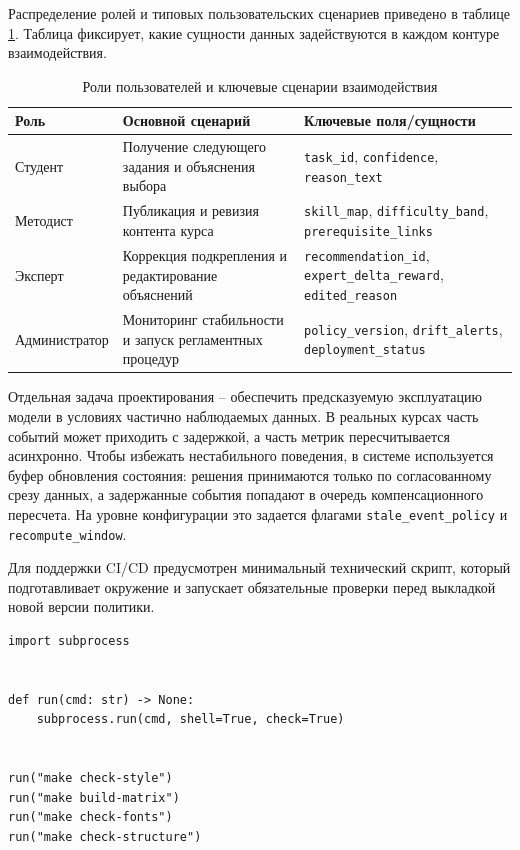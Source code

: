 Распределение ролей и типовых пользовательских сценариев приведено в таблице
\ref{tab:user-roles-scenarios}. Таблица фиксирует, какие сущности данных
задействуются в каждом контуре взаимодействия.

\begin{table}[htbp]
  \caption{Роли пользователей и ключевые сценарии взаимодействия}
  \label{tab:user-roles-scenarios}
  \centering

  \begin{tabular}{|p{}|p{}|p{}|}
    \hline
    Роль & Основной сценарий & Ключевые поля/сущности \\
    \hline
    Студент & Получение следующего задания и объяснения выбора & \texttt{task\_id}, \texttt{confidence}, \texttt{reason\_text} \\
    \hline
    Методист & Публикация и ревизия контента курса & \texttt{skill\_map}, \texttt{difficulty\_band}, \texttt{prerequisite\_links} \\
    \hline
    Эксперт & Коррекция подкрепления и редактирование объяснений & \texttt{recommendation\_id}, \texttt{expert\_delta\_reward}, \texttt{edited\_reason} \\
    \hline
    Администратор & Мониторинг стабильности и запуск регламентных процедур & \texttt{policy\_version}, \texttt{drift\_alerts}, \texttt{deployment\_status} \\
    \hline
  \end{tabular}
\end{table}

Отдельная задача проектирования -- обеспечить предсказуемую эксплуатацию модели
в условиях частично наблюдаемых данных. В реальных курсах часть событий может
приходить с задержкой, а часть метрик пересчитывается асинхронно. Чтобы
избежать нестабильного поведения, в системе используется буфер обновления
состояния: решения принимаются только по согласованному срезу данных, а
задержанные события попадают в очередь компенсационного пересчета. На уровне
конфигурации это задается флагами \texttt{stale\_event\_policy} и
\texttt{recompute\_window}.

Для поддержки CI/CD предусмотрен минимальный технический скрипт, который
подготавливает окружение и запускает обязательные проверки перед выкладкой
новой версии политики.

\begin{lstlisting}[style=sthgcode-python,caption={Пример автоматизированного pre-deploy сценария проверки}]
import subprocess


def run(cmd: str) -> None:
    subprocess.run(cmd, shell=True, check=True)


run("make check-style")
run("make build-matrix")
run("make check-fonts")
run("make check-structure")
\end{lstlisting}

